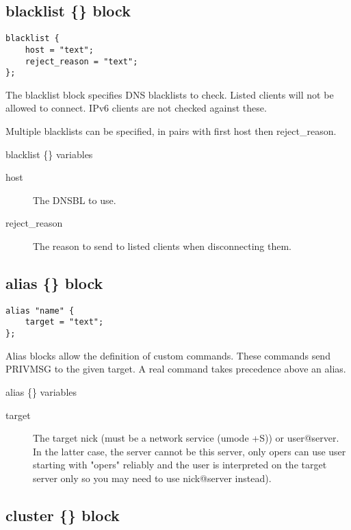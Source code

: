 \subsection{blacklist \{\} block}

\begin{verbatim}
blacklist {
	host = "text";
	reject_reason = "text";
};\end{verbatim}

	The blacklist block specifies DNS blacklists to check. 	Listed clients
	will not be allowed to connect. IPv6 clients are not checked against
	these.

	Multiple blacklists can be specified, in pairs with first host then
	reject\_reason.

{\sc blacklist \{\} variables}
\nopagebreak

\noindent
\begin{description}
\item[{host}]
	The DNSBL to use.

\item[{reject\_reason}]
	The reason to send to listed clients when disconnecting them.

\end{description}


\subsection{alias \{\} block}

\begin{verbatim}
alias "name" {
	target = "text";
};\end{verbatim}

	Alias blocks allow the definition of custom commands.
	These commands send PRIVMSG to the given target. A real
	command takes precedence above an alias.


{\sc alias \{\} variables}
\nopagebreak

\noindent
\begin{description}
\item[{target}]
	The target nick (must be a network service (umode +S)) or
	user@server.
	In the latter case, the server cannot be this server,
	only opers can use user starting with "opers" reliably and
	the user is interpreted on the target server only
	so you may need to use nick@server instead).
\end{description}


\subsection{cluster \{\} block}

